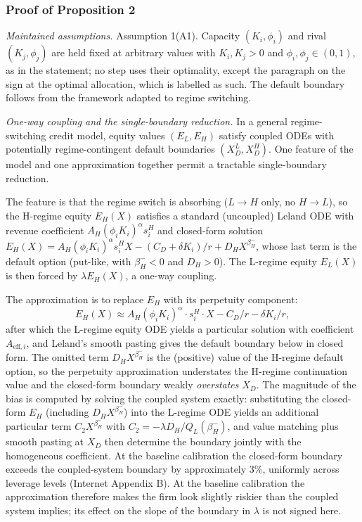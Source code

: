 \documentclass[
  11pt,
  letterpaper,
]{scrartcl}
\begin{document}
\subsubsection*{Proof of Proposition 2}\label{proof-of-proposition-2}

\emph{Maintained assumptions.} Assumption 1(A1). Capacity
\((K_i, \phi_i)\) and rival \((K_j, \phi_j)\) are held fixed at
arbitrary values with \(K_i, K_j > 0\) and
\(\phi_i, \phi_j \in (0, 1)\), as in the statement; no step uses their
optimality, except the paragraph on the sign at the optimal allocation,
which is labelled as such. The default boundary follows from the
\citet{leland1994corporate} framework adapted to regime switching.

\emph{One-way coupling and the single-boundary reduction.} In a general
regime-switching credit model, equity values \((E_L, E_H)\) satisfy
coupled ODEs with potentially regime-contingent default boundaries
\((X_D^L, X_D^H)\). One feature of the model and one approximation
together permit a tractable single-boundary reduction.

The feature is that the regime switch is absorbing (\(L \to H\) only, no
\(H \to L\)), so the H-regime equity \(E_H(X)\) satisfies a standard
(uncoupled) Leland ODE with revenue coefficient
\(A_H (\phi_i K_i)^\alpha s_i^H\) and closed-form solution
\(E_H(X) = A_H (\phi_i K_i)^\alpha s_i^H X - (C_D + \delta K_i)/r + D_H X^{\beta_H^-}\),
whose last term is the default option (put-like, with \(\beta_H^- < 0\)
and \(D_H > 0\)). The L-regime equity \(E_L(X)\) is then forced by
\(\lambda E_H(X)\), a one-way coupling.

The approximation is to replace \(E_H\) with its perpetuity component:
\[
E_H(X) \approx A_H (\phi_i K_i)^\alpha \cdot s_i^H \cdot X - C_D/r - \delta K_i/r,
\] after which the L-regime equity ODE yields a particular solution with
coefficient \(A_{\text{eff},i}\), and Leland's smooth pasting gives the
default boundary below in closed form. The omitted term
\(D_H X^{\beta_H^-}\) is the (positive) value of the H-regime default
option, so the perpetuity approximation understates the H-regime
continuation value and the closed-form boundary weakly \emph{overstates}
\(X_D\). The magnitude of the bias is computed by solving the coupled
system exactly: substituting the closed-form \(E_H\) (including
\(D_H X^{\beta_H^-}\)) into the L-regime ODE yields an additional
particular term \(C_2 X^{\beta_H^-}\) with
\(C_2 = -\lambda D_H / Q_L(\beta_H^-)\), and value matching plus smooth
pasting at \(X_D\) then determine the boundary jointly with the
homogeneous coefficient. At the baseline calibration the closed-form
boundary exceeds the coupled-system boundary by approximately 3\%,
uniformly across leverage levels (Internet Appendix B). At the baseline
calibration the approximation therefore makes the firm look slightly
riskier than the coupled system implies; its effect on the slope of the
boundary in \(\lambda\) is not signed here.
\end{document}
